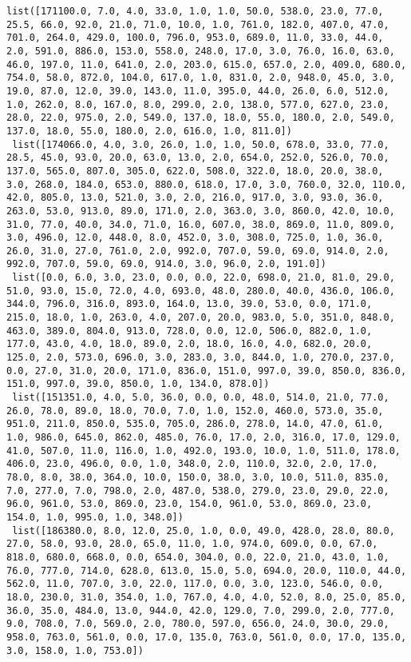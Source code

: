 \documentclass[11pt]{article}
\begin{document}
\begin{Verbatim}[commandchars=\\\{\}]
 list([171100.0, 7.0, 4.0, 33.0, 1.0, 1.0, 50.0, 538.0, 23.0, 77.0, 25.5, 66.0, 92.0, 21.0, 71.0, 10.0, 1.0, 761.0, 182.0, 407.0, 47.0, 701.0, 264.0, 429.0, 100.0, 796.0, 953.0, 689.0, 11.0, 33.0, 44.0, 2.0, 591.0, 886.0, 153.0, 558.0, 248.0, 17.0, 3.0, 76.0, 16.0, 63.0, 46.0, 197.0, 11.0, 641.0, 2.0, 203.0, 615.0, 657.0, 2.0, 409.0, 680.0, 754.0, 58.0, 872.0, 104.0, 617.0, 1.0, 831.0, 2.0, 948.0, 45.0, 3.0, 19.0, 87.0, 12.0, 39.0, 143.0, 11.0, 395.0, 44.0, 26.0, 6.0, 512.0, 1.0, 262.0, 8.0, 167.0, 8.0, 299.0, 2.0, 138.0, 577.0, 627.0, 23.0, 28.0, 22.0, 975.0, 2.0, 549.0, 137.0, 18.0, 55.0, 180.0, 2.0, 549.0, 137.0, 18.0, 55.0, 180.0, 2.0, 616.0, 1.0, 811.0])
 list([174066.0, 4.0, 3.0, 26.0, 1.0, 1.0, 50.0, 678.0, 33.0, 77.0, 28.5, 45.0, 93.0, 20.0, 63.0, 13.0, 2.0, 654.0, 252.0, 526.0, 70.0, 137.0, 565.0, 807.0, 305.0, 622.0, 508.0, 322.0, 18.0, 20.0, 38.0, 3.0, 268.0, 184.0, 653.0, 880.0, 618.0, 17.0, 3.0, 760.0, 32.0, 110.0, 42.0, 805.0, 13.0, 521.0, 3.0, 2.0, 216.0, 917.0, 3.0, 93.0, 36.0, 263.0, 53.0, 913.0, 89.0, 171.0, 2.0, 363.0, 3.0, 860.0, 42.0, 10.0, 31.0, 77.0, 40.0, 34.0, 71.0, 16.0, 607.0, 38.0, 869.0, 11.0, 809.0, 3.0, 496.0, 12.0, 448.0, 8.0, 452.0, 3.0, 308.0, 725.0, 1.0, 36.0, 26.0, 31.0, 27.0, 761.0, 2.0, 992.0, 707.0, 59.0, 69.0, 914.0, 2.0, 992.0, 707.0, 59.0, 69.0, 914.0, 3.0, 96.0, 2.0, 191.0])
 list([0.0, 6.0, 3.0, 23.0, 0.0, 0.0, 22.0, 698.0, 21.0, 81.0, 29.0, 51.0, 93.0, 15.0, 72.0, 4.0, 693.0, 48.0, 280.0, 40.0, 436.0, 106.0, 344.0, 796.0, 316.0, 893.0, 164.0, 13.0, 39.0, 53.0, 0.0, 171.0, 215.0, 18.0, 1.0, 263.0, 4.0, 207.0, 20.0, 983.0, 5.0, 351.0, 848.0, 463.0, 389.0, 804.0, 913.0, 728.0, 0.0, 12.0, 506.0, 882.0, 1.0, 177.0, 43.0, 4.0, 18.0, 89.0, 2.0, 18.0, 16.0, 4.0, 682.0, 20.0, 125.0, 2.0, 573.0, 696.0, 3.0, 283.0, 3.0, 844.0, 1.0, 270.0, 237.0, 0.0, 27.0, 31.0, 20.0, 171.0, 836.0, 151.0, 997.0, 39.0, 850.0, 836.0, 151.0, 997.0, 39.0, 850.0, 1.0, 134.0, 878.0])
 list([151351.0, 4.0, 5.0, 36.0, 0.0, 0.0, 48.0, 514.0, 21.0, 77.0, 26.0, 78.0, 89.0, 18.0, 70.0, 7.0, 1.0, 152.0, 460.0, 573.0, 35.0, 951.0, 211.0, 850.0, 535.0, 705.0, 286.0, 278.0, 14.0, 47.0, 61.0, 1.0, 986.0, 645.0, 862.0, 485.0, 76.0, 17.0, 2.0, 316.0, 17.0, 129.0, 41.0, 507.0, 11.0, 116.0, 1.0, 492.0, 193.0, 10.0, 1.0, 511.0, 178.0, 406.0, 23.0, 496.0, 0.0, 1.0, 348.0, 2.0, 110.0, 32.0, 2.0, 17.0, 78.0, 8.0, 38.0, 364.0, 10.0, 150.0, 38.0, 3.0, 10.0, 511.0, 835.0, 7.0, 277.0, 7.0, 798.0, 2.0, 487.0, 538.0, 279.0, 23.0, 29.0, 22.0, 96.0, 961.0, 53.0, 869.0, 23.0, 154.0, 961.0, 53.0, 869.0, 23.0, 154.0, 1.0, 995.0, 1.0, 348.0])
 list([186380.0, 8.0, 12.0, 25.0, 1.0, 0.0, 49.0, 428.0, 28.0, 80.0, 27.0, 58.0, 93.0, 28.0, 65.0, 11.0, 1.0, 974.0, 609.0, 0.0, 67.0, 818.0, 680.0, 668.0, 0.0, 654.0, 304.0, 0.0, 22.0, 21.0, 43.0, 1.0, 76.0, 777.0, 714.0, 628.0, 613.0, 15.0, 5.0, 694.0, 20.0, 110.0, 44.0, 562.0, 11.0, 707.0, 3.0, 22.0, 117.0, 0.0, 3.0, 123.0, 546.0, 0.0, 18.0, 230.0, 31.0, 354.0, 1.0, 767.0, 4.0, 4.0, 52.0, 8.0, 25.0, 85.0, 36.0, 35.0, 484.0, 13.0, 944.0, 42.0, 129.0, 7.0, 299.0, 2.0, 777.0, 9.0, 708.0, 7.0, 569.0, 2.0, 780.0, 597.0, 656.0, 24.0, 30.0, 29.0, 958.0, 763.0, 561.0, 0.0, 17.0, 135.0, 763.0, 561.0, 0.0, 17.0, 135.0, 3.0, 158.0, 1.0, 753.0])

\end{Verbatim}
\end{document}
